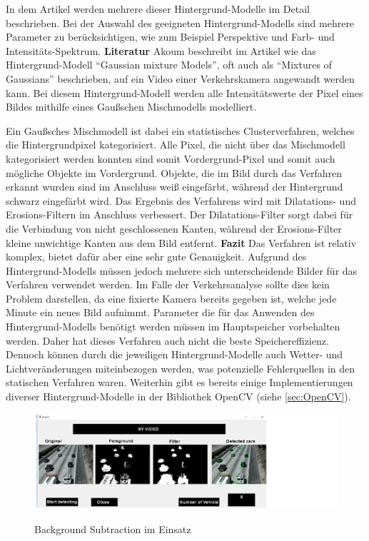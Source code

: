 In dem Artikel \cite{mcivor2000background} werden mehrere dieser Hintergrund-Modelle im Detail beschrieben.
Bei der Auswahl des geeigneten Hintergrund-Modells sind mehrere Parameter zu berücksichtigen, wie zum Beispiel Perspektive und Farb- und Intensitäts-Spektrum.
\newline\newline
\textbf{Literatur}\newline
Akoum beschreibt im Artikel \cite{akoumBSIP} wie das Hintergrund-Modell "`Gaussian mixture Models"', oft auch als "`Mixtures of Gaussians"' beschrieben, auf ein Video einer Verkehrskamera angewandt werden kann.
Bei diesem Hintergrund-Modell werden alle Intensitätswerte der Pixel eines Bildes mithilfe eines Gaußschen Mischmodells modelliert.

Ein Gaußsches Mischmodell ist dabei ein statistisches Clusterverfahren, welches die Hintergrundpixel kategorisiert.
Alle Pixel, die nicht über das Mischmodell kategorisiert werden konnten sind somit Vordergrund-Pixel und somit auch mögliche Objekte im Vordergrund.
Objekte, die im Bild durch das Verfahren erkannt wurden sind im Anschluss weiß eingefärbt, während der Hintergrund schwarz eingefärbt wird.
Das Ergebnis des Verfahrens wird mit Dilatations- und Erosions-Filtern im Anschluss verbessert. 
Der Dilatations-Filter sorgt dabei für die Verbindung von nicht geschlossenen Kanten, während der Erosions-Filter kleine unwichtige Kanten aus dem Bild entfernt.
\newline\newline
\textbf{Fazit}\newline
Das Verfahren ist relativ komplex, bietet dafür aber eine sehr gute Genauigkeit. 
Aufgrund des Hintergrund-Modells müssen jedoch mehrere sich unterscheidende Bilder für das Verfahren verwendet werden.
Im Falle der Verkehrsanalyse sollte dies kein Problem darstellen, da eine fixierte Kamera bereits gegeben ist, welche jede Minute ein neues Bild aufnimmt.
Parameter die für das Anwenden des Hintergrund-Modells benötigt werden müssen im Hauptspeicher vorbehalten werden.
Daher hat dieses Verfahren auch nicht die beste Speichereffizienz.
Dennoch können durch die jeweiligen Hintergrund-Modelle auch Wetter- und Lichtveränderungen miteinbezogen werden, was potenzielle Fehlerquellen in den statischen Verfahren waren.
Weiterhin gibt es bereits einige Implementierungen diverser Hintergrund-Modelle in der Bibliothek OpenCV (siehe \ref{sec:OpenCV}).
\begin{figure}[!ht]
   \centering
     \includegraphics[width=15cm]{Bilder/mogpaper} \\
 \caption{Background Subtraction im Einsatz}
 \label{fig:BSSoftware}
\end{figure}
\newpage

